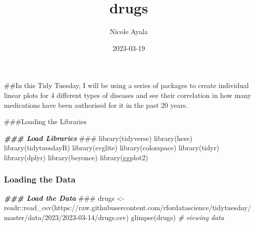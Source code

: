 \documentclass[
]{article}
\title{drugs}
\author{Nicole Ayala}
\date{2023-03-19}
\newenvironment{Shaded}{\begin{snugshade}}{\end{snugshade}}
\newcommand{\AlertTok}[1]{\textcolor[rgb]{0.94,0.16,0.16}{#1}}
\newcommand{\CommentTok}[1]{\textcolor[rgb]{0.56,0.35,0.01}{\textit{#1}}}
\newcommand{\DocumentationTok}[1]{\textcolor[rgb]{0.56,0.35,0.01}{\textbf{\textit{#1}}}}
\newcommand{\FunctionTok}[1]{\textcolor[rgb]{0.00,0.00,0.00}{#1}}
\newcommand{\NormalTok}[1]{#1}
\newcommand{\OtherTok}[1]{\textcolor[rgb]{0.56,0.35,0.01}{#1}}
\newcommand{\SpecialCharTok}[1]{\textcolor[rgb]{0.00,0.00,0.00}{#1}}
\newcommand{\StringTok}[1]{\textcolor[rgb]{0.31,0.60,0.02}{#1}}
\begin{document}
\maketitle

\#\#In this Tidy Tuesday, I will be using a series of packages to create
individual linear plots for 4 different types of diseases and see their
correlation in how many medications have been authorised for it in the
past 20 years.

\#\#\#Loading the Libraries

\begin{Shaded}
\begin{Highlighting}[]
\DocumentationTok{\#\#\# Load Libraries }\AlertTok{\#\#\#}
\FunctionTok{library}\NormalTok{(tidyverse)}
\FunctionTok{library}\NormalTok{(here)}
\FunctionTok{library}\NormalTok{(tidytuesdayR)}
\FunctionTok{library}\NormalTok{(svglite)}
\FunctionTok{library}\NormalTok{(colorspace)}
\FunctionTok{library}\NormalTok{(tidyr)}
\FunctionTok{library}\NormalTok{(dplyr)}
\FunctionTok{library}\NormalTok{(beyonce)}
\FunctionTok{library}\NormalTok{(ggplot2)}
\end{Highlighting}
\end{Shaded}

\hypertarget{loading-the-data}{%
\subsubsection{Loading the Data}\label{loading-the-data}}

\begin{Shaded}
\begin{Highlighting}[]
\DocumentationTok{\#\#\# Load the Data }\AlertTok{\#\#\#}
\NormalTok{drugs }\OtherTok{\textless{}{-}}\NormalTok{ readr}\SpecialCharTok{::}\FunctionTok{read\_csv}\NormalTok{(}\StringTok{\textquotesingle{}https://raw.githubusercontent.com/rfordatascience/tidytuesday/master/data/2023/2023{-}03{-}14/drugs.csv\textquotesingle{}}\NormalTok{)}
\FunctionTok{glimpse}\NormalTok{(drugs) }\CommentTok{\# viewing data}
\end{Highlighting}
\end{Shaded}
\end{document}
